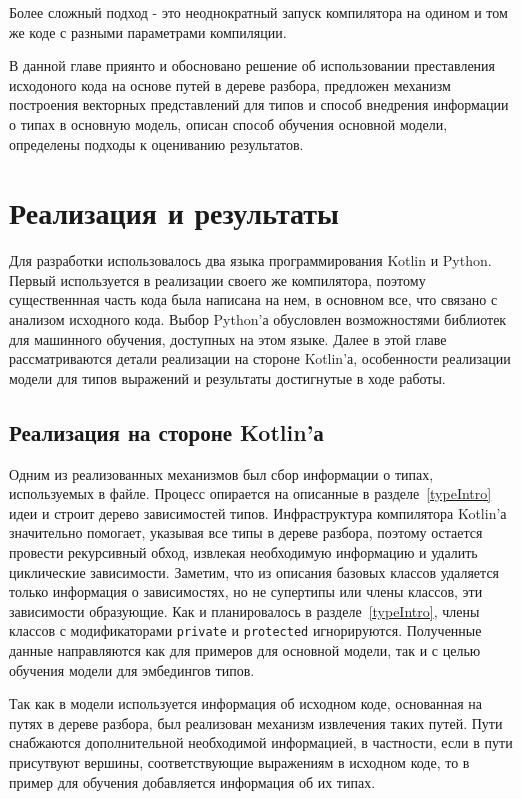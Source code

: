 \documentclass[times,specification,annotation]{itmo-student-thesis}
\begin{document}
Более сложный подход - это неоднократный запуск компилятора на одином и том же коде с разными параметрами компиляции. 

\chapterconclusion

В данной главе приянто и обосновано решение об использовании преставления исходоного кода на основе путей в дереве разбора, предложен механизм построения векторных представлений для типов и способ внедрения информации о типах в основную модель, описан способ обучения основной модели, определены подходы к оцениванию результатов.


\chapter{Реализация и результаты}
Для разработки использовалось два языка программирования Kotlin и Python. Первый используется в реализации своего же компилятора, поэтому существеннная часть кода была написана на нем, в основном все, что связано с анализом исходного кода. Выбор Python'а обусловлен возможностями библиотек для машинного обучения, доступных на этом языке. Далее в этой главе рассматриваются детали реализации на стороне Kotlin'а, особенности реализации модели для типов выражений и результаты достигнутые в ходе работы.

\section{Реализация на стороне Kotlin'а}
Одним из реализованных механизмов был сбор информации о типах, используемых в файле. Процесс опирается на описанные в разделе~\ref{typeIntro} идеи и строит дерево зависимостей типов. Инфраструктура компилятора Kotlin'а значительно помогает, указывая все типы в дереве разбора, поэтому остается провести рекурсивный обход, извлекая необходимую информацию и удалить циклические зависимости. Заметим, что из описания базовых классов удаляется только информация о зависимостях, но не супертипы или члены классов, эти зависимости образующие. Как и планировалось в разделе~\ref{typeIntro}, члены классов с модификаторами \texttt{private} и \texttt{protected} игнорируются. Полученные данные направляются как для примеров для основной модели, так и с целью обучения модели для эмбедингов типов.

Так как в модели используется информация об исходном коде, основанная на путях в дереве разбора, был реализован механизм извлечения таких путей. Пути снабжаются дополнительной необходимой информацией, в частности, если в пути присутвуют вершины, соответствующие выражениям в исходном коде, то в пример для обучения добавляется информация об их типах.
\end{document}
